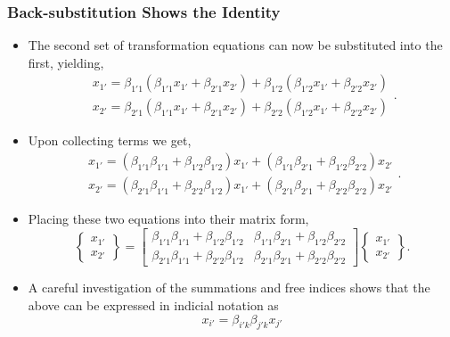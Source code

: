 \documentclass[11pt]{article}
\begin{document}
\subsubsection*{Back-substitution Shows the Identity}
\label{sec:org69009ad}
\begin{itemize}
\item The second set of transformation equations can now be substituted into the first, yielding,
$$ \begin{array}{c}
   x_{1'} = \beta_{1'1} (\beta_{1'1} x_{1'} + \beta_{2'1} x_{2'}) + \beta_{1'2} (\beta_{1'2} x_{1'} + \beta_{2'2} x_{2'}) \\
   x_{2'} = \beta_{2'1} (\beta_{1'1} x_{1'} + \beta_{2'1} x_{2'}) + \beta_{2'2} (\beta_{1'2} x_{1'} + \beta_{2'2} x_{2'})
  \end{array}. $$
\end{itemize}
\begin{itemize}
\item Upon collecting terms we get,
$$ \begin{array}{c}
   x_{1'} = (\beta_{1'1} \beta_{1'1} + \beta_{1'2} \beta_{1'2}) x_{1'} + (\beta_{1'1} \beta_{2'1} + \beta_{1'2} \beta_{2'2}) x_{2'} \\
   x_{2'} = (\beta_{2'1} \beta_{1'1} + \beta_{2'2} \beta_{1'2}) x_{1'} + (\beta_{2'1} \beta_{2'1} + \beta_{2'2} \beta_{2'2}) x_{2'}
  \end{array}. $$
\item Placing these two equations into their matrix form,
$$ \begin{Bmatrix} x_{1'} \\ x_{2'} \end{Bmatrix} = \begin{bmatrix}  \beta_{1'1} \beta_{1'1} + \beta_{1'2} \beta_{1'2} & \beta_{1'1} \beta_{2'1} + \beta_{1'2} \beta_{2'2} \\ \beta_{2'1} \beta_{1'1} + \beta_{2'2} \beta_{1'2} & \beta_{2'1} \beta_{2'1} + \beta_{2'2} \beta_{2'2} \end{bmatrix} \begin{Bmatrix} x_{1'} \\ x_{2'} \end{Bmatrix}. $$
\item A careful investigation of the summations and free indices shows that the above can be expressed in indicial notation as
$$ x_{i'} = \beta_{i'k} \beta_{j'k} x_{j'} $$
\end{itemize}
\end{document}
